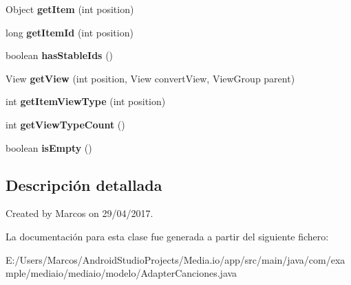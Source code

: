 \begin{DoxyCompactItemize}
Object {\bfseries get\+Item} (int position)
\item 
\mbox{\label{classcom_1_1example_1_1mediaio_1_1mediaio_1_1modelo_1_1_adapter_canciones_a56c15944afeae14894bd8298e990fc50}} 
long {\bfseries get\+Item\+Id} (int position)
\item 
\mbox{\label{classcom_1_1example_1_1mediaio_1_1mediaio_1_1modelo_1_1_adapter_canciones_a6fc28c896274cfc287e619834e26cc6b}} 
boolean {\bfseries has\+Stable\+Ids} ()
\item 
\mbox{\label{classcom_1_1example_1_1mediaio_1_1mediaio_1_1modelo_1_1_adapter_canciones_a958145ddb74c1070f005d0c29401f4aa}} 
View {\bfseries get\+View} (int position, View convert\+View, View\+Group parent)
\item 
\mbox{\label{classcom_1_1example_1_1mediaio_1_1mediaio_1_1modelo_1_1_adapter_canciones_a230d00b4dbea37cff1028a985165ab0b}} 
int {\bfseries get\+Item\+View\+Type} (int position)
\item 
\mbox{\label{classcom_1_1example_1_1mediaio_1_1mediaio_1_1modelo_1_1_adapter_canciones_a22277bc976749df7d497415056167957}} 
int {\bfseries get\+View\+Type\+Count} ()
\item 
\mbox{\label{classcom_1_1example_1_1mediaio_1_1mediaio_1_1modelo_1_1_adapter_canciones_a228d7b9dde7db0f0cb97755c71931574}} 
boolean {\bfseries is\+Empty} ()
\end{DoxyCompactItemize}


\subsection{Descripción detallada}
Created by Marcos on 29/04/2017. 

La documentación para esta clase fue generada a partir del siguiente fichero\+:\begin{DoxyCompactItemize}
\item 
E\+:/\+Users/\+Marcos/\+Android\+Studio\+Projects/\+Media.\+io/app/src/main/java/com/example/mediaio/mediaio/modelo/Adapter\+Canciones.\+java\end{DoxyCompactItemize}
